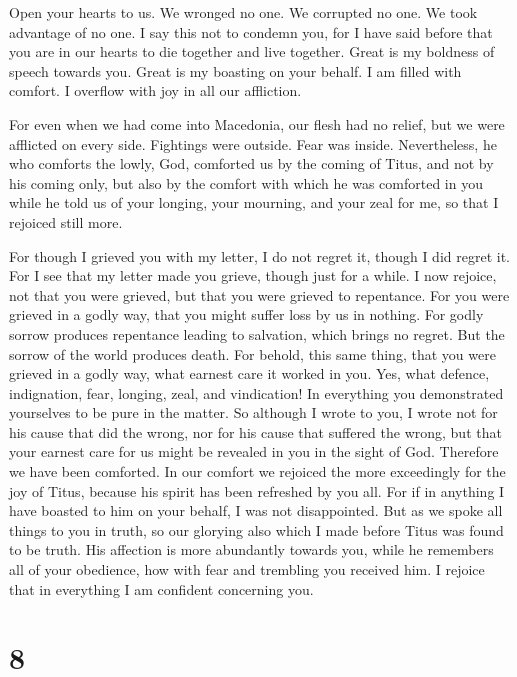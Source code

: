  Open your hearts to us. We wronged no one. We corrupted
no one. We took advantage of no one.  I say this not to
condemn you, for I have said before that you are in our hearts to die
together and live together.  Great is my boldness of
speech towards you. Great is my boasting on your behalf. I am filled
with comfort. I overflow with joy in all our affliction.

 For even when we had come into Macedonia, our flesh had
no relief, but we were afflicted on every side. Fightings were outside.
Fear was inside.  Nevertheless, he who comforts the lowly,
God, comforted us by the coming of Titus,  and not by his
coming only, but also by the comfort with which he was comforted in you
while he told us of your longing, your mourning, and your zeal for me,
so that I rejoiced still more.

 For though I grieved you with my letter, I do not regret
it, though I did regret it. For I see that my letter made you grieve,
though just for a while.  I now rejoice, not that you were
grieved, but that you were grieved to repentance. For you were grieved
in a godly way, that you might suffer loss by us in nothing.
 For godly sorrow produces repentance leading to
salvation, which brings no regret. But the sorrow of the world produces
death.  For behold, this same thing, that you were
grieved in a godly way, what earnest care it worked in you. Yes, what
defence, indignation, fear, longing, zeal, and vindication! In
everything you demonstrated yourselves to be pure in the matter.
 So although I wrote to you, I wrote not for his cause
that did the wrong, nor for his cause that suffered the wrong, but that
your earnest care for us might be revealed in you in the sight of God.
 Therefore we have been comforted. In our comfort we
rejoiced the more exceedingly for the joy of Titus, because his spirit
has been refreshed by you all.  For if in anything I have
boasted to him on your behalf, I was not disappointed. But as we spoke
all things to you in truth, so our glorying also which I made before
Titus was found to be truth.  His affection is more
abundantly towards you, while he remembers all of your obedience, how
with fear and trembling you received him.  I rejoice that
in everything I am confident concerning you.

\hypertarget{section-7}{%
\section{8}\label{section-7}}

